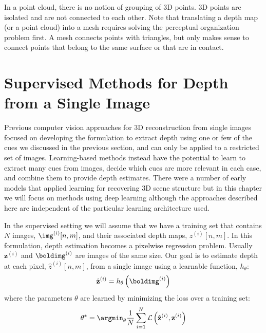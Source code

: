 In a point cloud, there is no notion of grouping of 3D points. 3D points are isolated and are not connected to each other. Note that translating a depth map (or a point cloud) into a mesh requires solving the perceptual organization problem first. A mesh connects points with triangles, but only makes sense to connect points that belong to the same surface or that are in contact. 



\section{Supervised Methods for Depth from a Single Image}

Previous computer vision approaches for 3D reconstruction from single images focused on developing the formulation to extract depth using one or few of the cues we discussed in the previous section, and can only be applied to a restricted set of images. Learning-based methods instead have the potential to learn to extract many cues from images, decide which cues are more relevant in each case, and combine them to provide depth estimates. There were a number of early models that applied learning for recovering 3D scene structure \cite{Saxena2008,Derek2005} but in this chapter we will focus on methods using deep learning although the approaches described here are independent of the particular learning architecture used. 


In the supervised setting we will assume that we have a training set that contains $N$ images, $\img^{(i)} [n,m]$, and their associated depth maps, $z^{(i)} [n,m]$. In this formulation, depth estimation becomes a pixelwise regression problem. Usually $\mathbf{z}^{(i)}$ and $\boldimg^{(i)}$ are images of the same size.
Our goal is to estimate depth at each pixel, $\hat{z}^{(i)}[n,m]$, from a single image using a learnable function, $h_\theta$:
\begin{equation}
\hat{\mathbf{z}}^{(i)} = h_\theta \left( \boldimg^{(i)} \right)
\end{equation}
where the parameters $\theta$ are learned by minimizing the loss over a training set:
\begin{equation}
\theta^* = \argmin_{\theta} \frac{1}{N}\sum_{i=1}^N \mathcal{L} \left( \hat{\mathbf{z}}^{(i)}, \mathbf{z}^{(i)} \right)
\end{equation}



